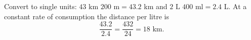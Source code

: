 Convert to single units: $43\text{ km }200\text{ m}=43.2$ km and $2\text{ L }400\text{ ml}=2.4$ L. At a constant rate of consumption the distance per litre is
\[
\dfrac{43.2}{2.4}=\dfrac{432}{24}=\boxed{18\text{ km}}.
\]
